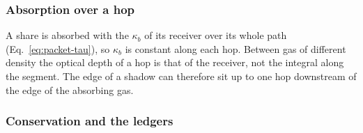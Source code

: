 \subsubsection{Absorption over a hop}
\label{sec:isrf-hop-absorption}

A share is absorbed with the $\kappa_b$ of its receiver over its whole path
(Eq.~\eqref{eq:packet-tau}), so $\kappa_b$ is constant along each hop. Between
gas of different density the optical depth of a hop is that of the receiver,
not the integral along the segment. The edge of a shadow can therefore sit up
to one hop downstream of the edge of the absorbing gas.

\subsubsection{Conservation and the ledgers}
\label{sec:packet-ledger}


